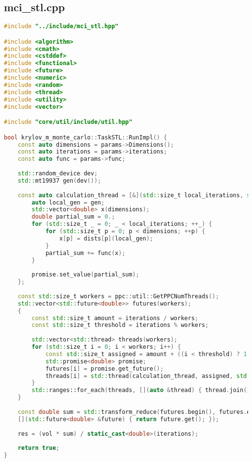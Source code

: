 \documentclass[a4paper,12pt]{article}
\begin{document}
\subsection{mci\_stl.cpp}
\begin{lstlisting}[language=C++]
#include "../include/mci_stl.hpp"

#include <algorithm>
#include <cmath>
#include <cstddef>
#include <functional>
#include <future>
#include <numeric>
#include <random>
#include <thread>
#include <utility>
#include <vector>

#include "core/util/include/util.hpp"

bool krylov_m_monte_carlo::TaskSTL::RunImpl() {
	const auto dimensions = params->Dimensions();
	const auto iterations = params->iterations;
	const auto func = params->func;
	
	std::random_device dev;
	std::mt19937 gen(dev());
	
	const auto calculation_thread = [&](std::size_t local_iterations, std::promise<double> &&promise) {
		auto local_gen = gen;
		std::vector<double> x(dimensions);
		double partial_sum = 0.;
		for (std::size_t _ = 0; _ < local_iterations; ++_) {
			for (std::size_t p = 0; p < dimensions; ++p) {
				x[p] = dists[p](local_gen);
			}
			partial_sum += func(x);
		}
		
		promise.set_value(partial_sum);
	};
	
	const std::size_t workers = ppc::util::GetPPCNumThreads();
	std::vector<std::future<double>> futures(workers);
	{
		const std::size_t amount = iterations / workers;
		const std::size_t threshold = iterations % workers;
		
		std::vector<std::thread> threads(workers);
		for (std::size_t i = 0; i < workers; i++) {
			const std::size_t assigned = amount + ((i < threshold) ? 1 : 0);
			std::promise<double> promise;
			futures[i] = promise.get_future();
			threads[i] = std::thread(calculation_thread, assigned, std::move(promise));
		}
		std::ranges::for_each(threads, [](auto &thread) { thread.join(); });
	}
	
	const double sum = std::transform_reduce(futures.begin(), futures.end(), 0., std::plus{},
	[](std::future<double> &future) { return future.get(); });
	
	res = (vol * sum) / static_cast<double>(iterations);
	
	return true;
}
\end{lstlisting}
\end{document}
